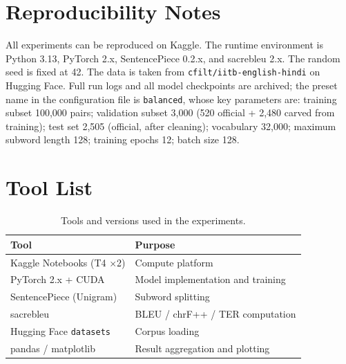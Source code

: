 \documentclass[a4paper,12pt]{vpcoe}
\begin{document}
\appendix
\chapter{Reproducibility Notes}
All experiments can be reproduced on Kaggle. The runtime environment is Python 3.13, PyTorch 2.x, SentencePiece 0.2.x, and sacrebleu 2.x. The random seed is fixed at 42. The data is taken from \texttt{cfilt/iitb-english-hindi} on Hugging Face. Full run logs and all model checkpoints are archived; the preset name in the configuration file is \texttt{balanced}, whose key parameters are: training subset 100,000 pairs; validation subset 3,000 (520 official + 2,480 carved from training); test set 2,505 (official, after cleaning); vocabulary 32,000; maximum subword length 128; training epochs 12; batch size 128.

\chapter{Tool List}
\begin{table}[h]
\centering
\caption{Tools and versions used in the experiments.}
\label{tab:tools}
\begin{tabular}{@{}ll@{}}
\toprule
Tool & Purpose \\
\midrule
Kaggle Notebooks (T4 $\times$2) & Compute platform \\
PyTorch 2.x + CUDA & Model implementation and training \\
SentencePiece (Unigram) & Subword splitting \\
sacrebleu & BLEU / chrF++ / TER computation \\
Hugging Face \texttt{datasets} & Corpus loading \\
pandas / matplotlib & Result aggregation and plotting \\
\bottomrule
\end{tabular}
\end{table}
\end{document}
